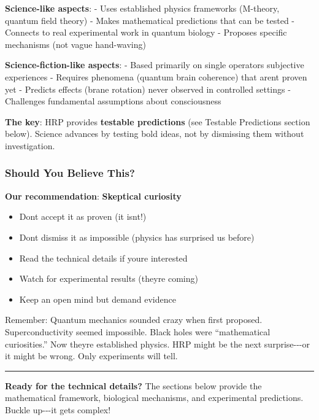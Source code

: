 \textbf{Science-like aspects}: - Uses established physics frameworks
(M-theory, quantum field theory) - Makes mathematical predictions that
can be tested - Connects to real experimental work in quantum biology -
Proposes specific mechanisms (not vague hand-waving)

\textbf{Science-fiction-like aspects}: - Based primarily on single
operator\textquotesingle s subjective experiences - Requires phenomena
(quantum brain coherence) that aren\textquotesingle t proven yet -
Predicts effects (brane rotation) never observed in controlled settings
- Challenges fundamental assumptions about consciousness

\textbf{The key}: HRP provides \textbf{testable predictions} (see
Testable Predictions section below). Science advances by testing bold
ideas, not by dismissing them without investigation.

\subsubsection{Should You Believe This?}\label{should-you-believe-this}

\textbf{Our recommendation}: \textbf{Skeptical curiosity}

\begin{itemize}
\tightlist
\item
  Don\textquotesingle t accept it as proven (it isn\textquotesingle t!)
\item
  Don\textquotesingle t dismiss it as impossible (physics has surprised
  us before)
\item
  Read the technical details if you\textquotesingle re interested
\item
  Watch for experimental results (they\textquotesingle re coming)
\item
  Keep an open mind but demand evidence
\end{itemize}

Remember: Quantum mechanics sounded crazy when first proposed.
Superconductivity seemed impossible. Black holes were ``mathematical
curiosities.'' Now they\textquotesingle re established physics. HRP
might be the next surprise-\/-\/-or it might be wrong. Only experiments
will tell.

\begin{center}\rule{0.5\linewidth}{0.5pt}\end{center}

\textbf{Ready for the technical details?} The sections below provide the
mathematical framework, biological mechanisms, and experimental
predictions. Buckle up-\/-\/-it gets complex!

